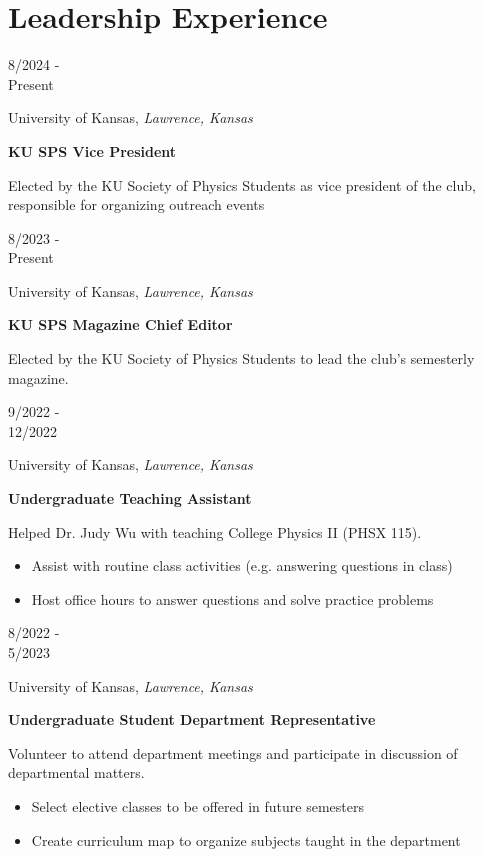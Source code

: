 \documentclass[12pt]{article}
\newenvironment{entry}[4]{
  \medskip
  \begin{minipage}[t]{0.75in}
    #3
  \end{minipage}
  \begin{minipage}[t]{\dimexpr\textwidth-0.75in}
    #1, \textit{#2}

    \textbf{#4}
    
    \smallskip
}{
  \end{minipage}
}
\begin{document}


\section*{Leadership Experience}\vspace{-1ex}

\begin{entry}{University of Kansas}{Lawrence, Kansas}{8/2024 -\\ Present}{KU SPS Vice President}
  Elected by the KU Society of Physics Students as vice president of the club, responsible for organizing outreach events
\end{entry}

\begin{entry}{University of Kansas}{Lawrence, Kansas}{8/2023 -\\ Present}{KU SPS Magazine Chief Editor}
  Elected by the KU Society of Physics Students to lead the club's
  semesterly magazine.
\end{entry}

\begin{entry}{University of Kansas}{Lawrence, Kansas}{9/2022 -\\ 12/2022}{Undergraduate Teaching Assistant}  
  Helped Dr. Judy Wu with teaching College Physics II (PHSX 115).
  \begin{itemize}
    \item Assist with routine class activities (e.g. answering questions in class)
    \item Host office hours to answer questions and solve practice problems
  \end{itemize}
\end{entry}

\begin{entry}{University of Kansas}{Lawrence, Kansas}{8/2022 -\\ 5/2023}{Undergraduate Student Department Representative}
  Volunteer to attend department meetings and participate in discussion of
  departmental matters.
  \begin{itemize}
    \item Select elective classes to be offered in future semesters
    \item Create curriculum map to organize subjects taught in the department
  \end{itemize}  
\end{entry}
\end{document}
